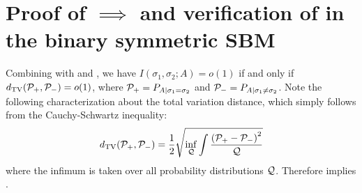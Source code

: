 \section{Proof of  $\implies$  and 
verification of   in the binary symmetric SBM}
\label{app:MITV}
Combining  with 
 and , we have
$I(\sigma_1,\sigma_2; A) = o(1)$ if and only if $\TV(\P_+,\P_-) =o(1)$,
where $\P_+=P_{A|\sigma_1=\sigma_2}$ and $\P_-=P_{A|\sigma_1\neq\sigma_2}$.
Note the following characterization about the total variation distance, which simply follows from the Cauchy-Schwartz inequality:
\begin{equation}
\TV(\P_+,\P_-) = \frac{1}{2} \sqrt{\inf_{\Q}  \int  \frac{  \left( \P_{+} - \P_{-} \right)^2 }{\Q }}
\label{eq:TVquadratic}
\end{equation}
where the infimum is taken over all probability distributions $\Q$. 
Therefore  implies .

%




